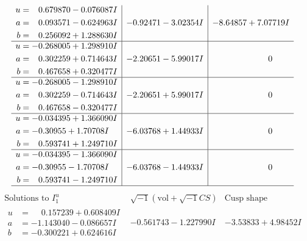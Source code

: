 \documentclass[1p]{elsarticle_modified}
\theoremstyle{definition}
\newcommand{\I}{\sqrt{-1}}
\begin{document}
$$\begin{array}{c|c|c}
\begin{aligned}
u &= \phantom{-}0.679870 - 0.076087 I \\
a &= \phantom{-}0.093571 - 0.624963 I \\
b &= \phantom{-}0.256092 + 1.288630 I\end{aligned}
 & -0.92471 - 3.02354 I & -8.64857 + 7.07719 I \\ \hline\begin{aligned}
u &= -0.268005 + 1.298910 I \\
a &= \phantom{-}0.302259 + 0.714643 I \\
b &= \phantom{-}0.467658 + 0.320477 I\end{aligned}
 & -2.20651 - 5.99017 I & \phantom{-0.000000 } 0 \\ \hline\begin{aligned}
u &= -0.268005 - 1.298910 I \\
a &= \phantom{-}0.302259 - 0.714643 I \\
b &= \phantom{-}0.467658 - 0.320477 I\end{aligned}
 & -2.20651 + 5.99017 I & \phantom{-0.000000 } 0 \\ \hline\begin{aligned}
u &= -0.034395 + 1.366090 I \\
a &= -0.30955 + 1.70708 I \\
b &= \phantom{-}0.593741 + 1.249710 I\end{aligned}
 & -6.03768 + 1.44933 I & \phantom{-0.000000 } 0 \\ \hline\begin{aligned}
u &= -0.034395 - 1.366090 I \\
a &= -0.30955 - 1.70708 I \\
b &= \phantom{-}0.593741 - 1.249710 I\end{aligned}
 & -6.03768 - 1.44933 I & \phantom{-0.000000 } 0\\
 \hline 
 \end{array}$$\newpage$$\begin{array}{c|c|c}  
\text{Solutions to }I^u_{1}& \I (\text{vol} + \sqrt{-1}CS) & \text{Cusp shape}\\
 \hline 
\begin{aligned}
u &= \phantom{-}0.157239 + 0.608409 I \\
a &= -1.143040 - 0.086657 I \\
b &= -0.300221 + 0.624616 I\end{aligned}
 & -0.561743 - 1.227990 I & -3.53833 + 4.98452 I \\ \hline\begin{aligned}

\end{aligned}
\end{array}$$
\end{document}

